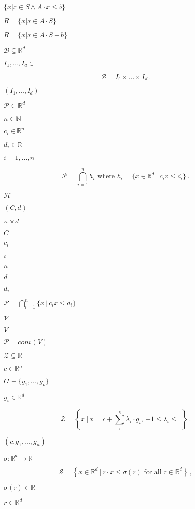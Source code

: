 \documentclass{article}
\begin{document}
$ \{ x | x \in S \land A\cdot x \leq b \} $
\pagebreak

$ R = \{ x | x \in A\cdot S \} $
\pagebreak

$ R = \{ x | x \in A\cdot S + b \} $
\pagebreak

$\mathcal{B}\subseteq\mathbb{R}^d$
\pagebreak

$I_1,\ldots,I_d \in \mathbb{I}$
\pagebreak

\[ \mathcal{B} = I_0 \times \ldots \times I_d\, . \]
\pagebreak

$(I_1,\ldots,I_d)$
\pagebreak

$\mathcal{P}\subseteq\mathbb{R}^d$
\pagebreak

$n\in\mathbb{N}$
\pagebreak

$c_i\in\mathbb{R}^n$
\pagebreak

$d_i \in \mathbb{R}$
\pagebreak

$i=1,\ldots,n$
\pagebreak

\[ \mathcal{P} = \bigcap_{i=1}^n h_i \text{ where } h_i = \{x\in\mathbb{R}^d \ |\ c_i x\leq d_i\}\, . \]
\pagebreak

$\mathcal{H}$
\pagebreak

$(C,d)$
\pagebreak

$n\times d$
\pagebreak

$C$
\pagebreak

$c_i$
\pagebreak

$i$
\pagebreak

$n$
\pagebreak

$d$
\pagebreak

$d_i$
\pagebreak

$\mathcal{P} = \bigcap_{i=1}^n \{x \ |\ c_i x\leq d_i\}$
\pagebreak

$\mathcal{V}$
\pagebreak

$V$
\pagebreak

$\mathcal{P} = \textit{conv}(V)$
\pagebreak

$\mathcal{Z}\subseteq\mathbb{R}$
\pagebreak

$c\in\mathbb{R}^n$
\pagebreak

$G=\{g_1,\ldots,g_n\}$
\pagebreak

$g_i\in \mathbb{R}^d$
\pagebreak

\[ \mathcal{Z} = \left\lbrace x\ \bigg|\ x = c + \sum_i^n \lambda_i\cdot g_i,\ {-1}\leq \lambda_i \leq 1 \right\rbrace\, . \]
\pagebreak

$(c,g_1,\ldots,g_n)$
\pagebreak

$\sigma:\mathbb{R}^d\rightarrow\mathbb{R}$
\pagebreak

\[ \mathcal{S} = \left\lbrace x\in\mathbb{R}^d\ \big|\ r\cdot x \leq \sigma(r) \text{ for all } r\in\mathbb{R}^d \right\rbrace\, , \]
\pagebreak

$\sigma(r)\in\mathbb{R}$
\pagebreak

$r\in\mathbb{R}^d$
\pagebreak
\end{document}
